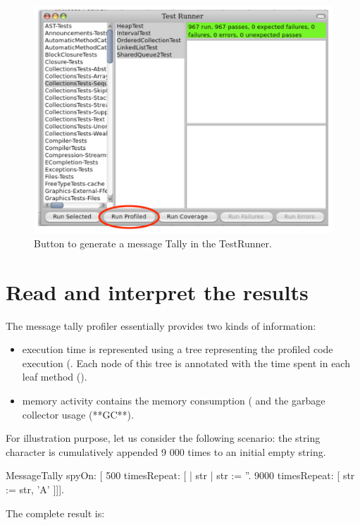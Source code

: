 \documentclass[a4paper,10pt,twoside]{book}
\begin{document}
\begin{figure}[h]
	\begin{center}
	\includegraphics[width=.8\linewidth]{testRunner}
	\caption{Button to generate a message Tally in the TestRunner.}
	\end{center}
\end{figure}


\section{Read and interpret the results} 
The message tally profiler essentially provides two kinds of information:
\begin{itemize}
\item execution time is represented using a tree representing the profiled code execution (. Each node of this tree is annotated with the time spent in each leaf method (). 

\item memory activity contains the memory consumption ( and the garbage collector usage (**GC**).
\end{itemize}

For illustration purpose, let us consider the following scenario: the string character  is cumulatively appended 9 000 times to an initial empty string.

\begin{code}{}
MessageTally spyOn: 
     [ 500 timesRepeat: [
                     | str |  
                     str := ''. 
                     9000 timesRepeat: [ str := str, 'A' ]]].
\end{code} 

The complete result is:
\end{document}
